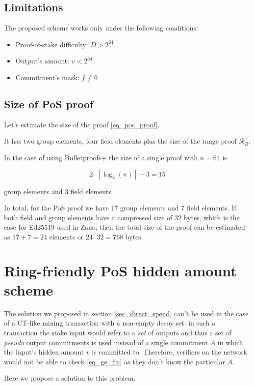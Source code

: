 \documentclass{article}
\newcommand{\ceil}[1]{\left\lceil #1 \right\rceil}
\numberwithin{figure}{section}
\begin{document}
\subsection{Limitations}

The proposed scheme works only under the following conditions:
\begin{itemize}
    \item Proof-of-stake difficulty: $D > 2^{64}$
    \item Output's amount: $v < 2^{64}$
    \item Commitment's mask: $f \neq 0$
\end{itemize}

\subsection{Size of PoS proof}

Let's estimate the size of the proof \eqref{eq_pos_proof}.

It has two group elements, four field elements plus the size of the range proof $\mathcal{R}_B$.

In the case of using Bulletproofs+ \cite{BP+} the size of a single proof with $n = 64$ is 

\[2 \cdot \ceil{\log_2(n)} + 3 = 15\]

group elements and 3 field elements.

In total, for the PoS proof we have 17 group elements and 7 field elements. If both field and group elements have a compressed size of 32 bytes, which is the case for Ed25519 used in Zano, then the total size of the proof can be estimated as $17+7=24$ elements or $24 \cdot 32 = 768$ bytes.


\section{Ring-friendly PoS hidden amount scheme}

The solution we proposed in section \ref{sec_direct_spend} can't be used in the case of a CT-like mining transaction with a non-empty decoy set: in such a transaction the stake input would refer to a \textit{set} of outputs and thus a set of \textit{pseudo} output commitments is used instead of a single commitment $A$ in which the input's hidden amount $v$ is committed to. Therefore, verifiers on the network would not be able to check \eqref{eq_ge_fin} as they don't know the particular $A$. 

Here we propose a solution to this problem.
\end{document}
